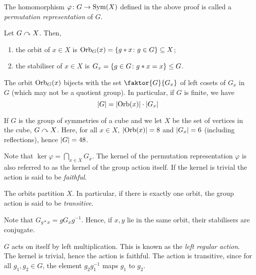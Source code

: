 \begin{definition}
	The homomorphism \( \varphi \colon G \to \operatorname{Sym}(X) \) defined in the above proof is called a \textit{permutation representation} of \( G \).
\end{definition}
\begin{definition}
	Let \( G \curvearrowright X \).
	Then,
	\begin{enumerate}
		\item the orbit of \( x \in X \) is \( \operatorname{Orb}_G(x) = \qty{g \ast x \colon g \in G} \subseteq X \);
		\item the stabiliser of \( x \in X \) is \( G_x = \qty{g \in G \colon g \ast x = x} \leq G \).
	\end{enumerate}
\end{definition}
\begin{theorem}
	The orbit \( \operatorname{Orb}_G(x) \) bijects with the set \( \faktor{G}{G_x} \) of left cosets of \( G_x \) in \( G \) (which may not be a quotient group).
	In particular, if \( G \) is finite, we have
	\[
		\abs{G} = \abs{\operatorname{Orb}(x)} \cdot \abs{G_x}
	\]
\end{theorem}
\begin{example}
	If \( G \) is the group of symmetries of a cube and we let \( X \) be the set of vertices in the cube, \( G \curvearrowright X \).
	Here, for all \( x \in X \), \( \abs{\operatorname{Orb}(x)} = 8 \) and \( \abs{G_x} = 6 \) (including reflections), hence \( \abs{G} = 48 \).
\end{example}
\begin{remark}
	Note that \( \ker \varphi = \bigcap_{x \in X} G_x \).
	The kernel of the permutation representation \( \varphi \) is also referred to as the kernel of the group action itself.
	If the kernel is trivial the action is said to be \textit{faithful}.

	The orbits partition \( X \).
	In particular, if there is exactly one orbit, the group action is said to be \textit{transitive}.

	Note that \( G_{g \ast x} = g G_x g^{-1} \).
	Hence, if \( x, y \) lie in the same orbit, their stabilisers are conjugate.
\end{remark}
\begin{example}
	\( G \) acts on itself by left multiplication.
	This is known as the \textit{left regular action}.
	The kernel is trivial, hence the action is faithful.
	The action is transitive, since for all \( g_1, g_2 \in G \), the element \( g_2 g_1^{-1} \) maps \( g_1 \) to \( g_2 \).
\end{example}

